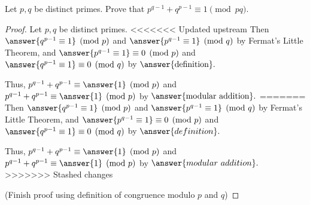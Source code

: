 \documentclass{ximera}
\begin{document}
\begin{br}\label{br:modpq}
  Let $p,q$ be distinct primes. Prove that $p^{q-1}+q^{p-1}\equiv 1 \pmod{pq}.$
 
 
  \begin{proof} Let $p,q$ be distinct primes. 
<<<<<<< Updated upstream
   Then $\answer{q^{p-1}\equiv 1}\pmod{p}$ and  $\answer{p^{q-1}\equiv 1}\pmod{q}$ by Fermat's Little Theorem, and $\answer{p^{q-1}\equiv 1}\equiv0\pmod{p}$ and  $\answer{q^{p-1}\equiv 1}\equiv 0\pmod{q}$ by $\answer{\textnormal{definition}}.$
   
   Thus, $p^{q-1}+q^{p-1}\equiv \answer{1} \pmod{p}$ and $p^{q-1}+q^{p-1}\equiv \answer{1} \pmod{p}$ by $\answer{\textnormal{modular addition}}.$
=======
   Then $\answer{q^{p-1}\equiv 1}\pmod{p}$ and  $\answer{p^{q-1}\equiv 1}\pmod{q}$ by Fermat's Little Theorem, and $\answer{p^{q-1}\equiv 1}\equiv0\pmod{p}$ and  $\answer{q^{p-1}\equiv 1}\equiv 0\pmod{q}$ by $\answer{definition}.$
   
   Thus, $p^{q-1}+q^{p-1}\equiv \answer{1} \pmod{p}$ and $p^{q-1}+q^{p-1}\equiv \answer{1} \pmod{p}$ by $\answer{modular\ addition}.$
>>>>>>> Stashed changes

   (Finish proof using definition of congruence modulo $p$ and $q$)
  \end{proof}
\end{br}

\end{document}
